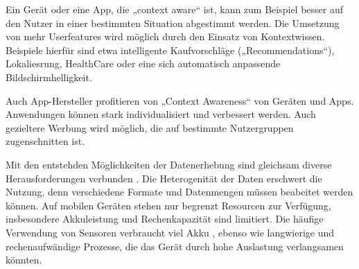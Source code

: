 Ein Gerät oder eine App, die „context aware“ ist, kann zum Beispiel besser auf den Nutzer in einer bestimmten Situation abgestimmt werden. Die Umsetzung von mehr Userfeatures wird möglich durch den Einsatz von Kontextwissen. Beispiele hierfür sind etwa intelligente Kaufvorschläge („Recommendations“), Lokaliesrung, HealthCare oder eine sich automatisch anpassende Bildschirmhelligkeit.

Auch App-Hersteller profitieren von „Context Awareness“ von Geräten und Apps. Anwendungen können stark individualisiert und verbessert werden. Auch gezieltere Werbung wird möglich, die auf bestimmte Nutzergruppen zugenschnitten ist.

Mit den entstehden Möglichkeiten der Datenerhebung sind gleichsam diverse Herausforderungen verbunden \cite{context2015, orsini2016}. Die Heterogenität der Daten erschwert die Nutzung, denn verschiedene Formate und Datenmengen müssen beabeitet werden können. Auf mobilen Geräten stehen nur begrenzt Resourcen zur Verfügung, insbesondere Akkuleistung und Rechenkapazität sind limitiert. Die häufige Verwendung von Sensoren verbraucht viel Akku \cite{context2015}, ebenso wie langwierige und rechenaufwändige Prozesse, die das Gerät durch hohe Auslastung verlangsamen könnten.
